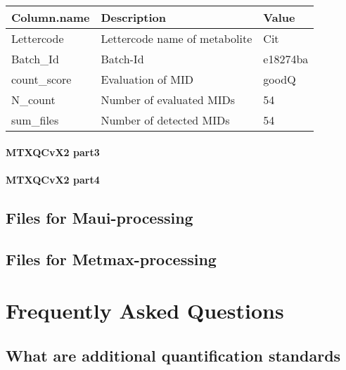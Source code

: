 \documentclass[]{book}
\begin{document}
\begin{tabu} to 
\toprule
Column.name & Description & Value\\
\midrule
{}  Lettercode & Lettercode name of metabolite & Cit\\
Batch\_Id & Batch-Id & e18274ba\\
  count\_score & Evaluation of MID & goodQ\\
N\_count & Number of evaluated MIDs & 54\\
  sum\_files & Number of detected MIDs & 54\\
\bottomrule
\end{tabu}

\hypertarget{mtxqcvx2-part3}{%
\subsubsection{MTXQCvX2 part3}\label{mtxqcvx2-part3}}

\hypertarget{mtxqcvx2-part4}{%
\subsubsection{MTXQCvX2 part4}\label{mtxqcvx2-part4}}

\hypertarget{files-for-maui-processing}{%
\section{Files for Maui-processing}\label{files-for-maui-processing}}

\hypertarget{files-for-metmax-processing}{%
\section{Files for Metmax-processing}\label{files-for-metmax-processing}}

\hypertarget{FAQ}{%
\chapter{Frequently Asked Questions}\label{FAQ}}

\hypertarget{what-are-additional-quantification-standards}{%
\section{What are additional quantification standards}\label{what-are-additional-quantification-standards}}
\end{document}
